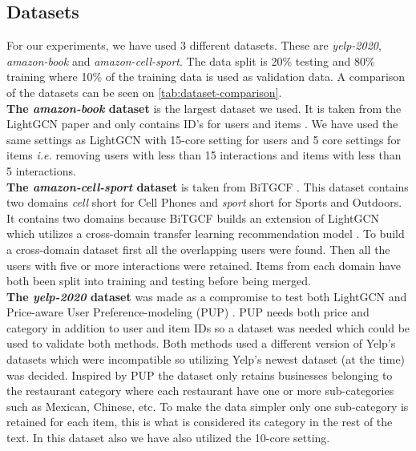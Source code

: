 \subsection{Datasets}
For our experiments, we have used 3 different datasets.
These are \textit{yelp-2020}, \textit{amazon-book} and \textit{amazon-cell-sport}.
The data split is 20\% testing and 80\% training where 10\% of the training data is used as validation data.
A comparison of the datasets can be seen on \autoref{tab:dataset-comparison}.
\\
\textbf{The \textit{amazon-book} dataset} is the largest dataset we used.
It is taken from the LightGCN paper and only contains ID's for users and items \cite{lightgcn}.
We have used the same settings as LightGCN with 15-core setting for users and 5 core settings for items \textit{i.e.} removing users with less than 15 interactions and items with less than 5 interactions.
\\
\textbf{The \textit{amazon-cell-sport} dataset} is taken from BiTGCF \cite{BiTGCF}.
This dataset contains two domains \textit{cell} short for Cell Phones and \textit{sport} short for Sports and Outdoors.
It contains two domains because BiTGCF builds an extension of LightGCN which utilizes a cross-domain transfer learning recommendation model \cite{BiTGCF}.
To build a cross-domain dataset first all the overlapping users were found.
Then all the users with five or more interactions were retained.
Items from each domain have both been split into training and testing before being merged.
\\
\textbf{The \textit{yelp-2020} dataset} was made as a compromise to test both LightGCN and Price-aware User Preference-modeling (PUP) \cite{PUP, lightgcn}.
PUP needs both price and category in addition to user and item IDs so a dataset was needed which could be used to validate both methods.
Both methods used a different version of Yelp's datasets which were incompatible so utilizing Yelp's newest dataset (at the time) was decided.
Inspired by PUP the dataset only retains businesses belonging to the restaurant category where each restaurant have one or more sub-categories such as Mexican, Chinese, etc.
To make the data simpler only one sub-category is retained for each item, this is what is considered its category in the rest of the text.
In this dataset also we have also utilized the 10-core setting.


